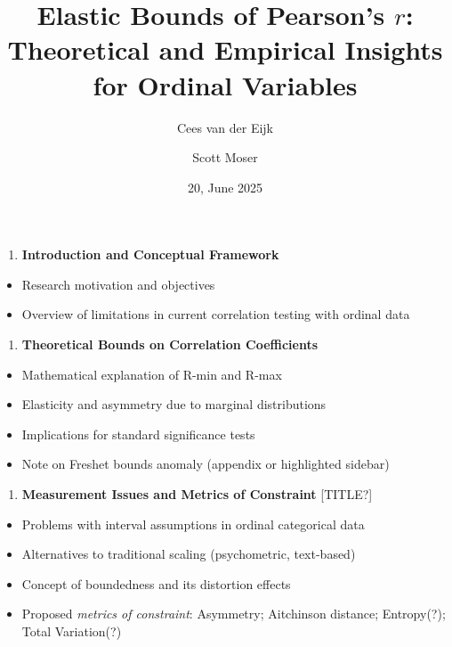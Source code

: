 \documentclass[
  12pt,
]{article}
\title{Elastic Bounds of Pearson's \(r\): Theoretical and Empirical
Insights for Ordinal Variables}
\author{Cees van der Eijk \and Scott Moser}
\date{20, June 2025}
\providecommand{\tightlist}{%
  \setlength{\itemsep}{0pt}\setlength{\parskip}{0pt}}\usepackage{longtable,booktabs,array}
\theoremstyle{plain}
\theoremstyle{definition}
\renewcommand*\contentsname{Table of contents}
\newcommand\contentsname{Table of contents}
\theoremstyle{remark}
\begin{document}
\maketitle

\renewcommand*\contentsname{Table of contents}
{
\hypersetup{linkcolor=}
\setcounter{tocdepth}{3}
\tableofcontents
}

\begin{enumerate}
\def\labelenumi{\arabic{enumi}.}
\tightlist
\item
  \textbf{Introduction and Conceptual Framework}
\end{enumerate}

\begin{itemize}
\tightlist
\item
  Research motivation and objectives
\item
  Overview of limitations in current correlation testing with ordinal
  data
\end{itemize}

\begin{enumerate}
\def\labelenumi{\arabic{enumi}.}
\setcounter{enumi}{1}
\tightlist
\item
  \textbf{Theoretical Bounds on Correlation Coefficients}
\end{enumerate}

\begin{itemize}
\tightlist
\item
  Mathematical explanation of R-min and R-max
\item
  Elasticity and asymmetry due to marginal distributions
\item
  Implications for standard significance tests
\item
  Note on Freshet bounds anomaly (appendix or highlighted sidebar)
\end{itemize}

\begin{enumerate}
\def\labelenumi{\arabic{enumi}.}
\setcounter{enumi}{2}
\tightlist
\item
  \textbf{Measurement Issues and Metrics of Constraint} {[}TITLE?{]}
\end{enumerate}

\begin{itemize}
\tightlist
\item
  Problems with interval assumptions in ordinal categorical data
\item
  Alternatives to traditional scaling (psychometric, text-based)
\item
  Concept of boundedness and its distortion effects
\item
  Proposed \emph{metrics of constraint}: Asymmetry; Aitchinson distance;
  Entropy(?); Total Variation(?)
\end{itemize}
\end{document}
